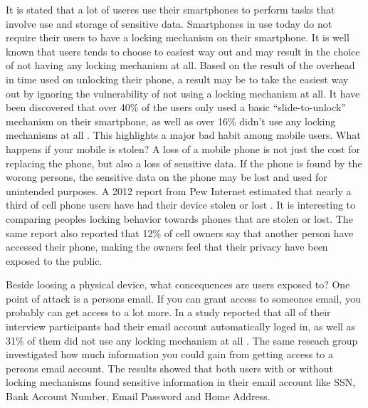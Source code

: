   It is stated that a lot of useres use their smartphones to perform tasks that involve use and storage of sensitive data. Smartphones in use today do not require their users to have a locking mechanism on their smartphone. It is well known that users tends to choose to easiest way out and may result in the choice of not having any locking mechanism at all. Based on the result of the overhead in time used on unlocking their phone, a result may be to take the easiest way out by ignoring the vulnerability of not using a locking mechanism at all. It have been discovered that over 40\% of the users only used a basic ``slide-to-unlock'' mechanism on their smartphone, as well as over 16\% didn't use any locking mechanisms at all \cite{habits3}. This highlights a major bad habit among mobile users. What happens if your mobile is stolen? A loss of a mobile phone is not just the cost for replacing the phone, but also a loss of sensitive data. If the phone is found by the worong persons, the sensitive data on the phone may be lost and used for unintended purposes. A 2012 report from Pew Internet estimated that nearly a third of cell phone users have had their device stolen or lost \cite{StolenLost}. It is interesting to comparing peoples locking behavior towards phones that are stolen or lost. The same report also reported that 12\% of cell owners say that another person have accessed their phone, making the owners feel that their privacy have been exposed to the public.

  Beside loosing a physical device, what concequences are users exposed to? One point of attack is a persons email. If you can grant access to someones email, you probably can get access to a lot more. In a study reported that all of their interview participants had their email account automatically loged in, as well as 31\% of them did not use any locking mechanism at all \cite{Egelman}. The same reseach group investigated how much information you could gain from getting access to a persons email account. The results showed that both users with or without locking mechanisms found sensitive information in their email account like SSN, Bank Account Number, Email Password and Home Address.

